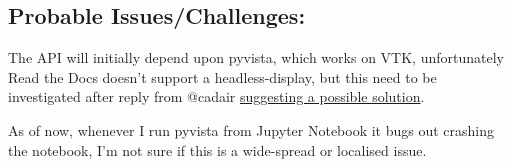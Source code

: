\subsection{Probable Issues/Challenges:} \label{subsec:issues_challenges}
    \vspace*{-0.5cm}
    \begin{focus}
        \item The API will initially depend upon pyvista, which works on VTK, unfortunately Read the Docs doesn't support a headless-display, but this need to be investigated after reply from @cadair \href{https://github.com/sunpy/sunpy/pull/4591#issuecomment-749542653}{suggesting a possible solution}.
        \item As of now, whenever I run pyvista from Jupyter Notebook it bugs out crashing the notebook, I'm not sure if this is a wide-spread or localised issue.
    \end{focus}